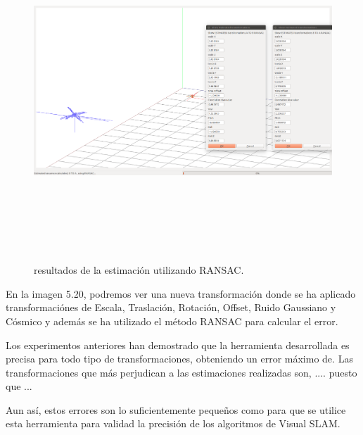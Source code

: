 \begin{figure}[h][H]
\begin{center}
\label{fig:opciones de View}\includegraphics[height=12.0cm,width=18.0cm]{img/cap6/LoadTwoDataSets_RANSAC.png}
\hspace{0.5cm}

\end{center}

\caption{ resultados de la estimación  utilizando RANSAC.}
\end{figure}

En la imagen 5.20, podremos ver una nueva transformación donde se ha aplicado transformaciónes de Escala, Traslación, Rotación, Offset, Ruido Gaussiano y Cósmico y además se ha utilizado el método RANSAC para calcular el error.

Los experimentos anteriores han demostrado que la herramienta desarrollada es precisa para todo tipo de transformaciones, obteniendo un error máximo de. Las transformaciones que más perjudican a las estimaciones realizadas son, .... puesto que ...

Aun así, estos errores son lo suficientemente pequeños como para que se utilice esta herramienta para validad la precisión de los algoritmos de Visual SLAM.

\clearpage
\newpage






